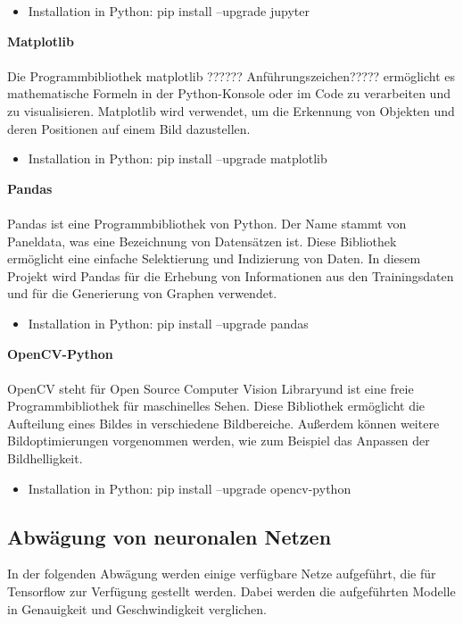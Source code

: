\documentclass[a4paper,12pt,oneside]{article}
\begin{document}
\begin{itemize}
\item Installation in Python: pip install --upgrade jupyter
  \end{itemize}
  
\textbf{Matplotlib}\\\\
Die Programmbibliothek matplotlib ?????? Anführungszeichen????? ermöglicht es mathematische Formeln in der Python-Konsole oder im Code zu verarbeiten und zu visualisieren.
Matplotlib wird verwendet, um die Erkennung von Objekten und deren Positionen auf einem Bild dazustellen.

  \begin{itemize}
\item Installation in Python: pip install --upgrade matplotlib
  \end{itemize}
  
\textbf{Pandas}\\\\
Pandas ist eine Programmbibliothek von Python. Der Name stammt von \glqq Paneldata\grqq, was eine Bezeichnung von Datensätzen ist. Diese Bibliothek ermöglicht eine einfache Selektierung und Indizierung von Daten. In diesem Projekt wird Pandas für die Erhebung von Informationen aus den Trainingsdaten und für die Generierung von Graphen verwendet.

  \begin{itemize}
\item Installation in Python: pip install --upgrade pandas
  \end{itemize}
  
\textbf{OpenCV-Python}\\\\
OpenCV steht für \glqq Open Source Computer Vision Library\grqq und ist eine freie Programmbibliothek für maschinelles Sehen. Diese Bibliothek ermöglicht die Aufteilung eines Bildes in verschiedene Bildbereiche. Außerdem können weitere Bildoptimierungen vorgenommen werden, wie zum Beispiel das Anpassen der Bildhelligkeit.

  \begin{itemize}
\item Installation in Python: pip install --upgrade opencv-python
  \end{itemize}

  \subsection{Abwägung von neuronalen Netzen} 
In der folgenden Abwägung werden einige verfügbare Netze aufgeführt, die für Tensorflow zur Verfügung gestellt werden. Dabei werden die aufgeführten Modelle in Genauigkeit und Geschwindigkeit verglichen.
 
\end{document}
